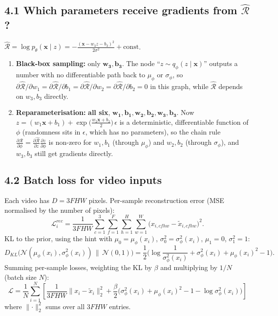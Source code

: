 \documentclass[11pt,a4paper]{article}
\newcommand{\N}{\mathcal{N}}
\newcommand{\x}{\mathbf{x}}
\begin{document}
\subsection*{4.1 Which parameters receive gradients from $\widehat{\mathcal{R}}$?}

$\widehat{\mathcal{R}} = \log p_\theta(\x\mid z) = -\frac{(\x-w_3z-b_3)^2}{2\sigma^2} + \text{const}$.

\begin{enumerate}[label=(\alph*)]
\item \textbf{Black-box sampling:} only $\bm{w_3, b_3}$. The node ``$z\sim q_\phi(z\mid\x)$'' outputs a number with no differentiable path back to $\mu_\phi$ or $\sigma_\phi$, so $\partial\widehat{\mathcal{R}}/\partial w_1=\partial\widehat{\mathcal{R}}/\partial b_1=\partial\widehat{\mathcal{R}}/\partial w_2=\partial\widehat{\mathcal{R}}/\partial b_2=0$ in this graph, while $\widehat{\mathcal{R}}$ depends on $w_3,b_3$ directly.
\item \textbf{Reparameterisation:} \textbf{all six}, $\bm{w_1,b_1,w_2,b_2,w_3,b_3}$. Now $z=(w_1\x+b_1)+\exp\!\big(\tfrac{w_2\x+b_2}{2}\big)\,\epsilon$ is a deterministic, differentiable function of $\phi$ (randomness sits in $\epsilon$, which has no parameters), so the chain rule
$\frac{\partial\widehat{\mathcal{R}}}{\partial\phi}=\frac{\partial\widehat{\mathcal{R}}}{\partial z}\frac{\partial z}{\partial\phi}$ is non-zero for $w_1,b_1$ (through $\mu_\phi$) and $w_2,b_2$ (through $\sigma_\phi$), and $w_3,b_3$ still get gradients directly.
\end{enumerate}

\subsection*{4.2 Batch loss for video inputs}

Each video has $D = 3FHW$ pixels. Per-sample reconstruction error (MSE normalised by the number of pixels):
\[
\mathcal{L}^{rec}_i = \frac{1}{3FHW}\sum_{c=1}^{3}\sum_{f=1}^{F}\sum_{h=1}^{H}\sum_{w=1}^{W}\big(x_{i,cfhw}-\tilde{x}_{i,cfhw}\big)^2 .
\]
KL to the prior, using the hint with $\mu_0=\mu_\phi(x_i)$, $\sigma_0^2=\sigma^2_\phi(x_i)$, $\mu_1=0$, $\sigma_1^2=1$:
\[
D_{KL}\big(\N(\mu_\phi(x_i),\sigma_\phi^2(x_i))\,\|\,\N(0,1)\big)
=\frac12\Big(\log\frac{1}{\sigma_\phi^2(x_i)}+\sigma_\phi^2(x_i)+\mu_\phi(x_i)^2-1\Big).
\]
Summing per-sample losses, weighting the KL by $\beta$ and multiplying by $1/N$ (batch size $N$):
\[
\boxed{\;\mathcal{L}=\frac{1}{N}\sum_{i=1}^{N}\left[\frac{1}{3FHW}\big\lVert x_i-\tilde{x}_i\big\rVert_2^2
+\frac{\beta}{2}\Big(\sigma_\phi^2(x_i)+\mu_\phi(x_i)^2-1-\log\sigma_\phi^2(x_i)\Big)\right]\;}
\]
where $\lVert\cdot\rVert_2^2$ sums over all $3FHW$ entries.
\end{document}
